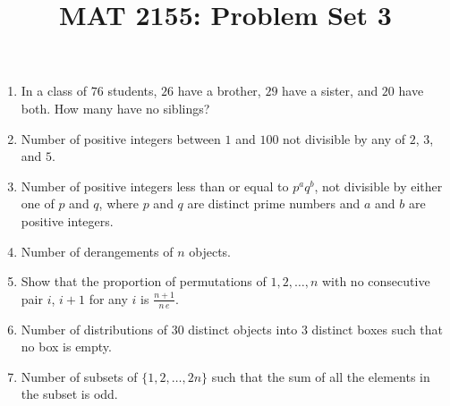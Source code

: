 \documentclass[svgnames]{amsart}
\title{MAT 2155: Problem Set 3}
\date{}
\begin{document}
\maketitle
\begin{enumerate}[leftmargin=*]
\item In a class of $76$ students, $26$ have a brother, $29$ have a sister, and $20$ have both. How many have no siblings?

\item Number of positive integers between $1$ and $100$ not divisible by any of $2$, $3$, and $5$.

\item Number of positive integers less than or equal to $p^a q^b$, not divisible by either one of $p$ and $q$, where $p$ and $q$ are distinct prime numbers and $a$ and $b$ are positive integers.

\item Number of derangements of $n$ objects.

\item Show that the proportion of permutations of $1, 2, \ldots, n$ with no consecutive pair $i$, $i + 1$ for any $i$ is $\frac{n + 1}{n\,e}$.

\item Number of distributions of $30$ distinct objects into $3$ distinct boxes such that no box is empty.

\item Number of subsets of $\{1, 2, \ldots, 2n\}$ such that the sum of all the elements in the subset is odd.

\end{enumerate}
\end{document}
